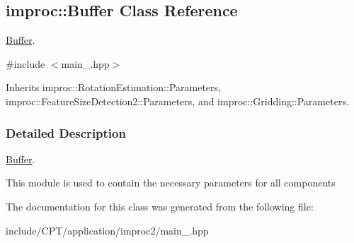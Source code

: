 \hypertarget{classimproc_1_1_buffer}{\subsection{improc\-:\-:Buffer Class Reference}
\label{classimproc_1_1_buffer}
}


\hyperlink{classimproc_1_1_buffer}{Buffer}.  




{\ttfamily \#include $<$main\-\_\-.\-hpp$>$}



Inherits improc\-::\-Rotation\-Estimation\-::\-Parameters, improc\-::\-Feature\-Size\-Detection2\-::\-Parameters, and improc\-::\-Gridding\-::\-Parameters.



\subsubsection{Detailed Description}
\hyperlink{classimproc_1_1_buffer}{Buffer}. 

This module is used to contain the necessary parameters for all components 

The documentation for this class was generated from the following file\-:\begin{DoxyCompactItemize}
\item 
include/\-C\-P\-T/application/improc2/main\-\_\-.\-hpp\end{DoxyCompactItemize}
